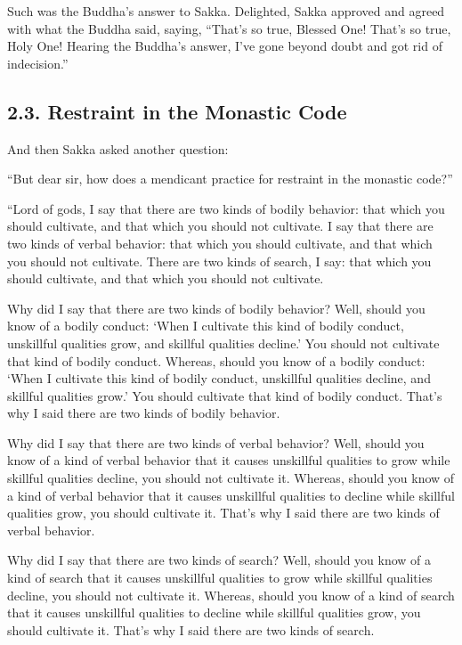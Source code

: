 \documentclass[12pt,openany]{book}%
\begin{document}
Such was the Buddha’s answer to Sakka. Delighted, Sakka approved and agreed with what the Buddha said, saying, “That’s so true, Blessed One! That’s so true, Holy One! Hearing the Buddha’s answer, I’ve gone beyond doubt and got rid of indecision.” 

\subsection*{2.3. Restraint in the Monastic Code }

And then Sakka asked another question: 

“But dear sir, how does a mendicant practice for restraint in the monastic code?” 

“Lord of gods, I say that there are two kinds of bodily behavior: that which you should cultivate, and that which you should not cultivate. I say that there are two kinds of verbal behavior: that which you should cultivate, and that which you should not cultivate. There are two kinds of search, I say: that which you should cultivate, and that which you should not cultivate. 

Why did I say that there are two kinds of bodily behavior? Well, should you know of a bodily conduct: ‘When I cultivate this kind of bodily conduct, unskillful qualities grow, and skillful qualities decline.’ You should not cultivate that kind of bodily conduct. Whereas, should you know of a bodily conduct: ‘When I cultivate this kind of bodily conduct, unskillful qualities decline, and skillful qualities grow.’ You should cultivate that kind of bodily conduct. That’s why I said there are two kinds of bodily behavior. 

Why did I say that there are two kinds of verbal behavior? Well, should you know of a kind of verbal behavior that it causes unskillful qualities to grow while skillful qualities decline, you should not cultivate it. Whereas, should you know of a kind of verbal behavior that it causes unskillful qualities to decline while skillful qualities grow, you should cultivate it. That’s why I said there are two kinds of verbal behavior. 

Why did I say that there are two kinds of search? Well, should you know of a kind of search that it causes unskillful qualities to grow while skillful qualities decline, you should not cultivate it. Whereas, should you know of a kind of search that it causes unskillful qualities to decline while skillful qualities grow, you should cultivate it. That’s why I said there are two kinds of search. 
\end{document}
